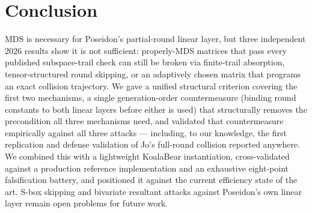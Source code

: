 \documentclass[11pt]{article}
\begin{document}
\section{Conclusion}

MDS is necessary for Poseidon's partial-round linear layer, but three
independent 2026 results show it is not sufficient: properly-MDS matrices
that pass every published subspace-trail check can still be broken via
finite-trail absorption, tensor-structured round skipping, or an
adaptively chosen matrix that programs an exact collision trajectory. We
gave a unified structural criterion covering the first two mechanisms, a
single generation-order countermeasure (binding round constants to both
linear layers before either is used) that structurally removes the
precondition all three mechanisms need, and validated that countermeasure
empirically against all three attacks --- including, to our knowledge,
the first replication and defense validation of Jo's full-round collision
reported anywhere. We combined this with a lightweight KoalaBear
instantiation, cross-validated against a production reference
implementation and an exhaustive eight-point falsification battery, and
positioned it against the current efficiency state of the art. S-box
skipping and bivariate resultant attacks against Poseidon's own linear
layer remain open problems for future work.
\end{document}
